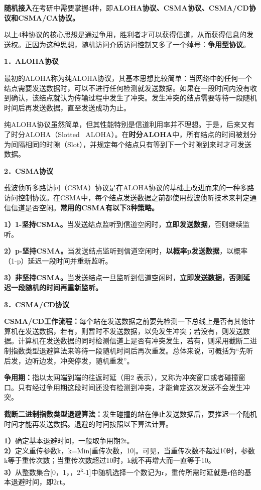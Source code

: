 \textbf{随机接入}在考研中需要掌握4种，即\textbf{ALOHA协议、CSMA协议、CSMA/CD协议和CSMA/CA协议。}

以上4种协议的核心思想是通过争用，胜利者才可以获得信道，从而获得信息的发送权。正因为这种思想，随机访问介质访问控制又多了一个绰号：\textbf{争用型协议}。

{\textbf{1．ALOHA协议}}

最初的ALOHA称为纯ALOHA协议，其基本思想比较简单：当网络中的任何一个结点需要发送数据时，可以不进行任何检测就发送数据。如果在一段时间内没有收到确认，该结点就认为传输过程中发生了冲突。发生冲突的结点需要等待一段随机时间后再发送数据，直至发送成功为止。

纯ALOHA协议虽然简单，但其性能特别是信道利用率并不理想。于是，后来又有了时分ALOHA（Slotted
~ALOHA）。在\textbf{时分ALOHA}中，所有结点的时间被划分为间隔相同的时隙（Slot），并规定每个结点只有等到下一个时隙到来时才可发送数据。

\textbf{{2．CSMA协议}}

载波侦听多路访问（CSMA）协议是在ALOHA协议的基础上改进而来的一种多路访问控制协议。在CSMA中，每个结点发送数据之前都使用载波侦听技术来判定通信信道是否空闲。\textbf{常用的CSMA有以下3种策略。}

\textbf{1）1-坚持CSMA。}当发送结点监听到信道空闲时，\textbf{立即发送数据}，否则继续监听。

\textbf{2）p-坚持CSMA。}当发送结点监听到信道空闲时，\textbf{以概率p发送数据}，以概率（1-p）延迟一段时间并重新监听。

\textbf{3）非坚持CSMA。}当发送结点一旦监听到信道空闲时，\textbf{立即发送数据，否则延迟一段随机的时间再重新监听。}

\textbf{{3．CSMA/CD协议}}

\textbf{CSMA/CD工作流程：}每个站在发送数据之前要先检测一下总线上是否有其他计算机在发送数据，若有，则暂时不发送数据，以免发生冲突；若没有，则发送数据。计算机在发送数据的同时检测信道上是否有冲突发生，若有，则采用截断二进制指数类型退避算法来等待一段随机时间后再次重发。总体来说，可概括为``先听后发，边听边发，冲突停发，随机重发''。

\textbf{争用期：}指以太网端到端的往返时延（用2
表示），又称为冲突窗口或者碰撞窗口。只有经过争用期这段时间还没有检测到冲突，才能肯定这次发送不会发生冲突。

\textbf{截断二进制指数类型退避算法：}发生碰撞的站在停止发送数据后，要推迟一个随机时间才能再发送数据。退避的时间按照以下算法计算。

\textbf{1）}确定基本退避时间，一般取争用期2t。\\
\textbf{2）}定义重传参数k，k=Min{[}重传次数，10{]}。可见，当重传次数不超过10时，参数k等于重传次数；当重传次数超过10时，k就不再增大而一直等于10。\\
\textbf{3）}从整数集合{[}0，1，，2\textsuperscript{k}-1{]}中随机选择一个数记为r，重传所需时延就是r倍的基本退避时间，即2rt。\\

